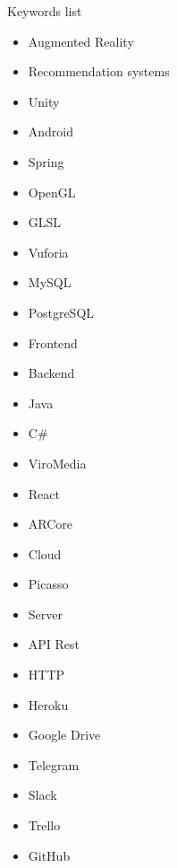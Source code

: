      Keywords list
     \begin{itemize}  
      \item Augmented Reality
      \item Recommendation systems
      \item Unity
      \item Android
      \item Spring
      \item OpenGL
      \item GLSL
      \item Vuforia
      \item MySQL
      \item PostgreSQL
      \item Frontend
      \item Backend
      \item Java
      \item C\#
      \item ViroMedia
      \item React
      \item ARCore
      \item Cloud
      \item Picasso
      \item Server
      \item API Rest
      \item HTTP
      \item Heroku
      \item Google Drive
      \item Telegram
      \item Slack
      \item Trello
      \item GitHub
    \end{itemize}
   


